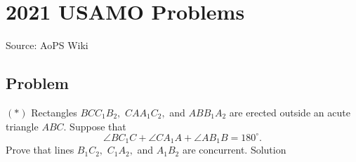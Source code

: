 \documentclass[12pt]{article}
\begin{document}
\section*{{2021 USAMO Problems}}
Source: AoPS Wiki

\subsection*{Problem}
$(*)$ Rectangles $BCC_1B_2,$ $CAA_1C_2,$ and $ABB_1A_2$ are erected outside an acute triangle $ABC.$ Suppose that \[\angle BC_1C+\angle CA_1A+\angle AB_1B=180^{\circ}.\] Prove that lines $B_1C_2,$ $C_1A_2,$ and $A_1B_2$ are concurrent. Solution
\end{document}
